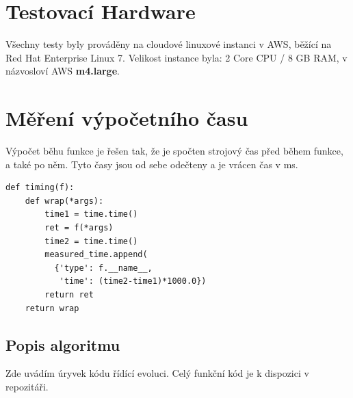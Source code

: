 \documentclass[a4paper,10pt,twocolumn]{article}
\begin{document}
\section{Testovací Hardware}
Všechny testy byly prováděny na cloudové linuxové instanci v AWS, běžící na Red Hat Enterprise Linux 7. Velikost instance byla:
  2 Core CPU / 8 GB RAM, v názvosloví AWS \textbf{m4.large}.


\section{Měření výpočetního času}
Výpočet běhu funkce je řešen tak, že je spočten strojový čas před během funkce, a také po něm. Tyto časy jsou od sebe odečteny a je vrácen čas v ms.

   \begin{verbatim}
def timing(f):
    def wrap(*args):
        time1 = time.time()
        ret = f(*args)
        time2 = time.time()
        measured_time.append(
          {'type': f.__name__,
           'time': (time2-time1)*1000.0})
        return ret
    return wrap
   \end{verbatim}


\subsection{Popis algoritmu}

Zde uvádím úryvek kódu řídící evoluci. Celý funkční kód je k dispozici v repozitáři.
\end{document}
